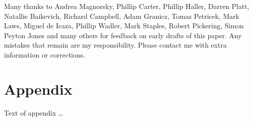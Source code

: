 \documentclass[acmsmall]{acmart}\settopmatter{}
\begin{document}
\begin{acks}                            %

Many thanks to Andrea Magnorsky, Phillip Carter, Phillip Haller, Darren Platt, Natallie Baikevich, Richard Campbell, Adam Granicz, Tomas Petricek, Mark Laws, Miguel de Icaza, Phillip Wadler, Mark Staples, Robert Pickering, Simon Peyton Jones and many others for feedback on early drafts of this paper.  Any mistakes that remain are my responsibility. Please contact me with extra information or corrections.

\end{acks}





\appendix
\section*{Appendix}

Text of appendix \ldots
\end{document}
